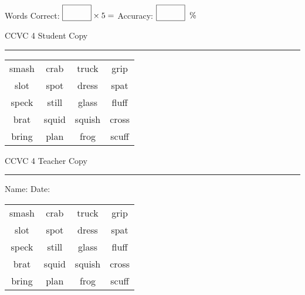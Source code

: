 \documentclass{memoir}
\begin{document}
\small

Words Correct: $\fbox{\phantom{\huge 100}} \times 5 = $ Accuracy: $\fbox{\phantom{\huge 100}}\;\; \%$ 

\vfill

\newpage


\footnotesize \noindent
CCVC 4 \hfill Student Copy
\smallskip
\hrule

\Large

\setlength{\tabcolsep}{14pt}
\def\arraystretch{3}

{\selectfont


\begin{vplace}[0.5]
\begin{center}
\begin{tabular}{cccc}
smash & crab        & truck & grip      \\
slot & spot & dress & spat            \\
speck & still & glass & fluff \\
brat               & squid & squish & cross \\
bring      & plan & frog & scuff \\
\end{tabular}
\end{center}
\end{vplace}

}

\newpage

\footnotesize \noindent
CCVC 4 \hfill Teacher Copy
\smallskip
\hrule

\small

\vfill

\noindent
Name: \underline{\hspace{1.75in}} \hfill Date: \underline{\hspace{1in}}

\Large

{\selectfont


\begin{vplace}[0.5]
\begin{center}
\begin{tabular}{cccc}
smash & crab        & truck & grip      \\
slot & spot & dress & spat            \\
speck & still & glass & fluff \\
brat               & squid & squish & cross \\
bring      & plan & frog & scuff \\
\end{tabular}
\end{center}
\end{vplace}



}
\end{document}
